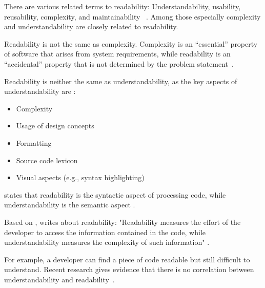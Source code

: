 \documentclass[%
class=scrreprt,
chapterprefix=false,%
open=right,%
twoside=false,%
paper=a4,%
logofile={Logo\_zentral\_farbig\_EN.png},%
thesistype=master,%
UKenglish,%
]{se2thesis}
\theoremstyle{definition}
\begin{document}
	There are various related terms to readability: Understandability, usability, reusability, complexity, and maintainability \cite{tashtoush2013impact}~\cite{tashtoush2013impact}. Among those especially complexity and understandability are closely related to readability.
	
	Readability is not the same as complexity. Complexity is an “essential” property of software that arises
	from system requirements, while readability is an “accidental” property that is not determined by the problem statement~\cite{buse2009learning, brooks1987no}.
	
	Readability is neither the same as understandability, as the key aspects of understandability are \cite{scalabrino2018comprehensive, martin2009clean, wilson2007beautiful, beck2007implementation}:
	\begin{itemize}
		\item Complexity
		\item Usage of design concepts
		\item Formatting
		\item Source code lexicon
		\item Visual aspects (e.g., syntax highlighting)
	\end{itemize}
	
	\citeauthor{posnett2011simpler} states that readability is the syntactic aspect of processing code, while understandability is the semantic aspect \cite{posnett2011simpler}.
	
	Based on \citeauthor{posnett2011simpler}, \citeauthor{scalabrino2018comprehensive} writes about readability: "Readability measures the effort of the developer to access the information contained in the code, while understandability measures the complexity of such information" \cite{scalabrino2018comprehensive, posnett2011simpler}.
	
	
	For example, a developer can find a piece of code readable but still difficult to understand. Recent research gives evidence that there is no correlation between understandability and readability~\cite{scalabrino2017automatically}.	
	
\end{document}

